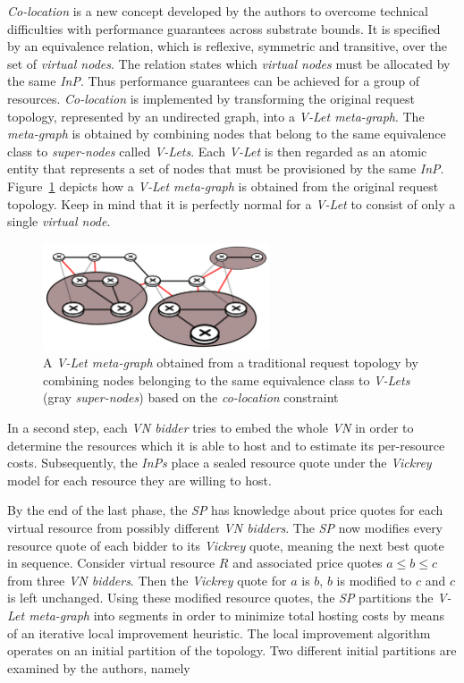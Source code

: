\documentclass[prodmode,acmtomccap]{acmlarge}
\begin{document}
\emph{Co-location} is a new concept developed by the authors to overcome technical difficulties with
performance guarantees across substrate bounds. It is specified by an equivalence relation, which is reflexive, symmetric and transitive, over the set of \emph{virtual nodes}. The relation
states which \emph{virtual nodes} must be allocated by the same \emph{InP}. Thus  performance guarantees can be achieved for a group of resources. 
\emph{Co-location} is implemented by transforming the original request topology, represented by an undirected graph, into a \emph{V-Let meta-graph}. The \emph{meta-graph} is obtained
by combining nodes that belong to the same equivalence class to \emph{super-nodes} called \emph{V-Lets}. Each \emph{V-Let} is then regarded as an atomic entity that represents a set of nodes that must
be provisioned by the same \emph{InP}. Figure~\ref{fig8} depicts how a \emph{V-Let meta-graph} is obtained from the original request topology. Keep in mind that it is perfectly normal for a \emph{V-Let}
to consist of only a single \emph{virtual node}.

\begin{figure}[htb]
	\centering
	\includegraphics[width=0.6\textwidth]{colocation}
	\caption{A \emph{V-Let meta-graph} obtained from a traditional request topology by combining nodes belonging to the same equivalence class to \emph{V-Lets} (gray \emph{super-nodes}) based on the
		\emph{co-location} constraint}
	\label{fig8}
\end{figure}

In a second step, each \emph{VN bidder} tries to embed the whole \emph{VN} in order to determine the resources which it is able to host and to estimate its per-resource costs. Subsequently, 
the \emph{InPs} place a sealed resource quote under the \emph{Vickrey} model for each resource they are willing to host.

By the end of the last phase, the \emph{SP} has knowledge about price quotes for each virtual resource from possibly different \emph{VN bidders}. The \emph{SP} now modifies every
resource quote of each bidder to its \emph{Vickrey} quote, meaning the next best quote in sequence. Consider virtual resource $R$ and associated price quotes $a \leq b \leq c$ from three \emph{VN bidders}.
Then the \emph{Vickrey} quote for $a$ is $b$, $b$ is modified to $c$ and $c$ is left unchanged.
Using these modified resource quotes, the \emph{SP} partitions the \emph{V-Let meta-graph} into segments
in order to minimize total hosting costs by means of an iterative local improvement heuristic. The local improvement algorithm operates on an initial partition of the topology. Two different initial partitions are
examined by the authors, namely
\end{document}
